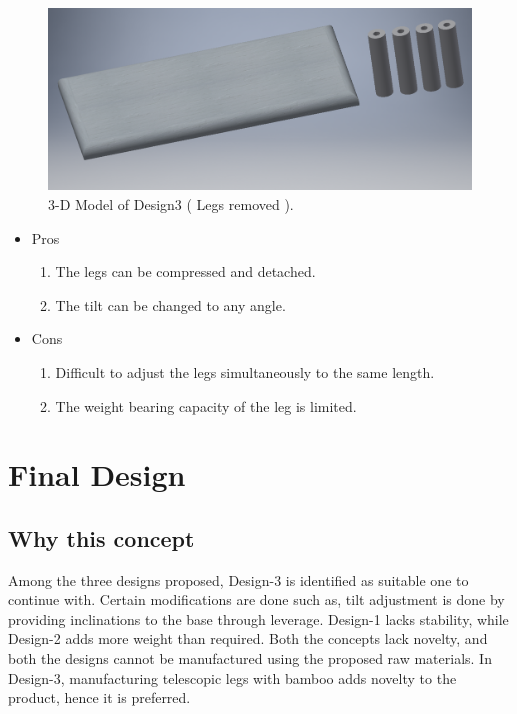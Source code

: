 \begin{figure}
  \includegraphics[width=\linewidth]{design3_2}
  \caption{3-D Model of Design3 ( Legs removed ).}
  \label{fig:Design1}
\end{figure}

\begin{itemize}
 \item Pros
 \begin{enumerate}
	\item The legs can be compressed and detached.
    \item The tilt can be changed to any angle.
 \end{enumerate}
 \item Cons
 \begin{enumerate}
	\item Difficult to adjust the legs simultaneously to the same length.
    \item The weight bearing capacity of the leg is limited.
 \end{enumerate}
\end{itemize}

\chapter{Final Design}

\section{Why this concept}

Among the three designs proposed, Design-3 is identified as suitable one to continue with. Certain modifications are done such as, tilt adjustment is done by providing inclinations to the base through leverage.  Design-1 lacks stability, while Design-2 adds more weight than required. Both the concepts lack novelty, and both the designs cannot be manufactured using the proposed raw materials. In Design-3, manufacturing telescopic legs with bamboo adds novelty to the product, hence it is preferred. 

